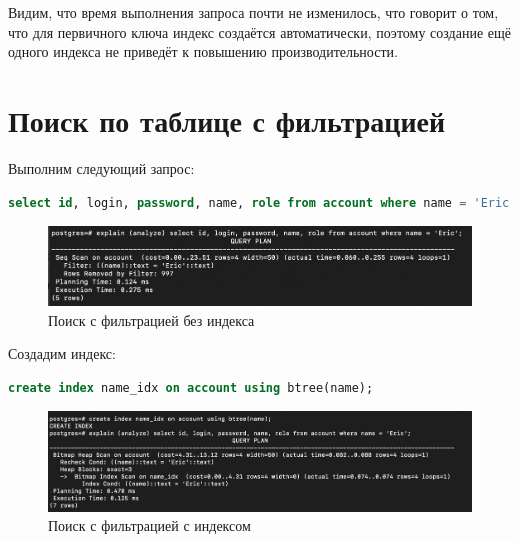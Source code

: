 Видим, что время выполнения запроса почти не изменилось, что говорит о том, что для первичного ключа индекс создаётся автоматически, поэтому создание ещё одного индекса не приведёт к повышению производительности.

\section{Поиск по таблице с фильтрацией}
Выполним следующий запрос:
\begin{lstlisting}[label=lst:field_1, caption=Запрос поиска с фильтрацией, language=sql]
select id, login, password, name, role from account where name = 'Eric';
\end{lstlisting}

\begin{figure}[h!]
	\begin{center}
		\includegraphics[width = \linewidth]{img/field.png}
	\end{center}
	\captionsetup{justification=centering}
	\caption{Поиск с фильтрацией без индекса}
	\label{img:get-example}
\end{figure}

Создадим индекс:

\begin{lstlisting}[label=lst:pk_1, caption=Создание индекса для поиска с фильтрацией, language=sql]
create index name_idx on account using btree(name);
\end{lstlisting}

\begin{figure}[h!]
	\begin{center}
		\includegraphics[width = \linewidth]{img/field_idx.png}
	\end{center}
	\captionsetup{justification=centering}
	\caption{Поиск с фильтрацией с индексом}
	\label{img:get-example}
\end{figure}

